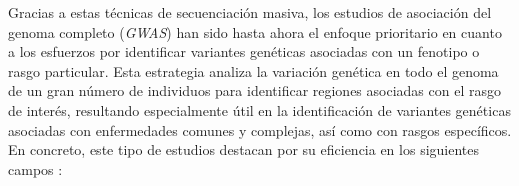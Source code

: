 \documentclass[IB,BIB]{TFUOC}%
\begin{document}
\normalsize


\newpage
Gracias a estas técnicas de secuenciación masiva, los estudios de asociación del genoma completo (\textit{GWAS}) han sido hasta ahora el enfoque prioritario en cuanto a los esfuerzos por identificar variantes genéticas asociadas con un fenotipo o rasgo particular. Esta estrategia analiza la variación genética en todo el genoma de un gran número de individuos para identificar regiones asociadas con el rasgo de interés, resultando especialmente útil en la identificación de variantes genéticas asociadas con enfermedades comunes y complejas, así como con rasgos específicos. En concreto, este tipo de estudios destacan por su eficiencia en los siguientes campos \cite{tam_benefits_2019, garrido_martin_multivariate_2020, qi_genetic_2022, turner_quality_2011, noauthor_genome-wide_2023}:

\footnotesize
\end{document}
